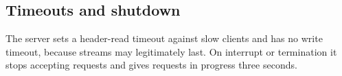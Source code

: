 \subsection{Timeouts and shutdown}

The server sets a header-read timeout against slow clients and has no write timeout,
because streams may legitimately last.  On interrupt or termination it stops accepting requests and
gives requests in progress three seconds.
